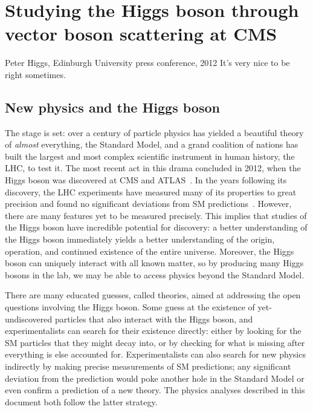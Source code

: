 \chapter{Studying the Higgs boson through vector boson scattering at CMS}
\begin{aquote}{Peter Higgs, Edinburgh University press conference, 2012}
    It's very nice to be right sometimes.
\end{aquote}

\section{New physics and the Higgs boson}
The stage is set: over a century of particle physics has yielded a beautiful theory of \textit{almost} everything, the Standard Model, and a grand coalition of nations has built the largest and most complex scientific instrument in human history, the LHC, to test it. 
The most recent act in this drama concluded in 2012, when the Higgs boson was discovered at CMS and ATLAS~\cite{CMSdisc, ATLASdisc}. 
In the years following its discovery, the LHC experiments have measured many of its properties to great precision and found no significant deviations from SM predictions~\cite{NatureHiggsCMS2022, NatureHiggsATLAS2022}. 
However, there are many features yet to be measured precisely. 
This implies that studies of the Higgs boson have incredible potential for discovery: a better understanding of the Higgs boson immediately yields a better understanding of the origin, operation, and continued existence of the entire universe. 
Moreover, the Higgs boson can uniquely interact with all known matter, so by producing many Higgs bosons in the lab, we may be able to access physics beyond the Standard Model. %

There are many educated guesses, called theories, aimed at addressing the open questions involving the Higgs boson. 
Some guess at the existence of yet-undiscovered particles that also interact with the Higgs boson\footnotemark{}, and experimentalists can search for their existence directly: either by looking for the SM particles that they might decay into, or by checking for what is missing after everything is else accounted for. 
Experimentalists can also search for new physics indirectly by making precise measurements of SM predictions; any significant deviation from the prediction would poke another hole in the Standard Model or even confirm a prediction of a new theory. 
The physics analyses described in this document both follow the latter strategy.

